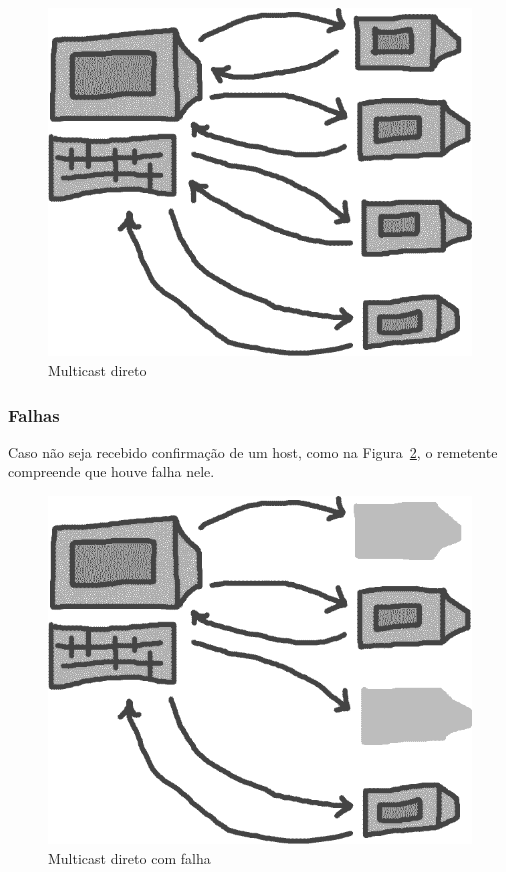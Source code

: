 \documentclass[12pt,twocolumn]{article}
\begin{document}
				\begin{figure}[t]	%
					\centering
					\includegraphics[width=0.9\linewidth]{multicast_simples.png}%
					\caption{Multicast direto}%
					\label{fig:multicast_direto}				
				\end{figure}
			
				\subsubsection{Falhas}			
			
					Caso não seja recebido confirmação de um host, como na Figura~\ref{fig:multicast_direto_falha}, o remetente compreende que houve falha nele.
					
					\begin{figure}[t]	%
						\centering
						\includegraphics[width=0.9\linewidth]{multicast_simples_falha.png}%
						\caption{Multicast direto com falha}%
						\label{fig:multicast_direto_falha}				
					\end{figure}							
				
\end{document}
